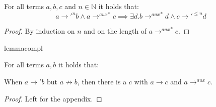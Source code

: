 \begin{corollary}

For all terms $a,b,c$ and $n \in \mathbb{N}$ it holds that:
\[
a {\longrightarrow'}^n b \land a {\longrightarrow^{aux}}^* c \implies \exists d . b {\longrightarrow^{aux}}^* d \land c {\longrightarrow'}^{\leq n} d
\]

\begin{proof}

By induction on $n$ and on the length of $a {\longrightarrow^{aux}}^* c$.

\end{proof}

\end{corollary}

\begin{restatable}[Complementarity]{lemma}{compl}

For all terms $a,b$ it holds that:

When $a \longrightarrow' b$ but $a \not\longrightarrow b$, then there is a $c$ with $a \longrightarrow c$ and $a \longrightarrow^{aux} c$.

\end{restatable}

\begin{proof}
Left for the appendix.
\end{proof}

